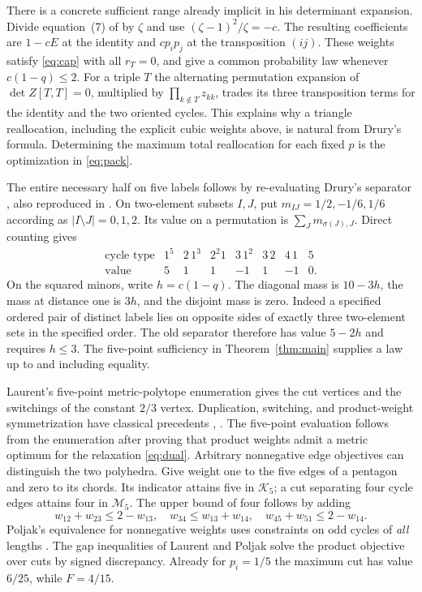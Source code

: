 \documentclass[11pt]{article}
\newcommand{\K}{\mathcal K}
\newcommand{\M}{\mathcal M}
\begin{document}
There is a concrete sufficient range already implicit in his determinant expansion. Divide equation~(7) of \cite[p.~162]{Drury} by $\zeta$ and use $(\zeta-1)^2/\zeta=-c$. The resulting coefficients are $1-cE$ at the identity and $cp_ip_j$ at the transposition $(ij)$. These weights satisfy \eqref{eq:cap} with all $r_T=0$, and give a common probability law whenever $c(1-q)\le2$. For a triple $T$ the alternating permutation expansion of $\det Z[T,T]=0$, multiplied by $\prod_{k\notin T}z_{kk}$, trades its three transposition terms for the identity and the two oriented cycles. This explains why a triangle reallocation, including the explicit cubic weights above, is natural from Drury's formula. Determining the maximum total reallocation for each fixed $p$ is the optimization in \eqref{eq:pack}.

The entire necessary half on five labels follows by re-evaluating Drury's separator \cite[p.~163]{Drury}, also reproduced in \cite[Example 3.2]{Homadi}. On two-element subsets $I,J$, put $m_{IJ}=1/2,-1/6,1/6$ according as $|I\setminus J|=0,1,2$. Its value on a permutation is $\sum_J m_{\sigma(J),J}$. Direct counting gives
\[
\begin{array}{c|rrrrrrr}
 \text{cycle type}&1^5&2\,1^3&2^2 1&3\,1^2&3\,2&4\,1&5\\
 \text{value}&5&1&1&-1&1&-1&0 .
\end{array}
\]
On the squared minors, write $h=c(1-q)$. The diagonal mass is $10-3h$, the mass at distance one is $3h$, and the disjoint mass is zero. Indeed a specified ordered pair of distinct labels lies on opposite sides of exactly three two-element sets in the specified order. The old separator therefore has value $5-2h$ and requires $h\le3$. The five-point sufficiency in Theorem~\ref{thm:main} supplies a law up to and including equality.

Laurent's five-point metric-polytope enumeration \cite[section 4.3, p.~152]{Laurent} gives the cut vertices and the switchings of the constant $2/3$ vertex. Duplication, switching, and product-weight symmetrization have classical precedents \cite[Proposition 2.3]{Laurent}, \cite[Proposition 2.1]{BET}. The five-point evaluation follows from the enumeration after proving that product weights admit a metric optimum for the relaxation \eqref{eq:dual}. Arbitrary nonnegative edge objectives can distinguish the two polyhedra. Give weight one to the five edges of a pentagon and zero to its chords. Its indicator attains five in $\K_5$; a cut separating four cycle edges attains four in $\M_5$. The upper bound of four follows by adding
\[
 w_{12}+w_{23}\le2-w_{13},\quad
 w_{34}\le w_{13}+w_{14},\quad
 w_{45}+w_{51}\le2-w_{14}.
\]
Poljak's equivalence for nonnegative weights uses constraints on odd cycles of \emph{all} lengths \cite[Theorem 4]{Poljak}. The gap inequalities of Laurent and Poljak \cite{Gap} solve the product objective over cuts by signed discrepancy. Already for $p_i=1/5$ the maximum cut has value $6/25$, while $F=4/15$.
\end{document}
